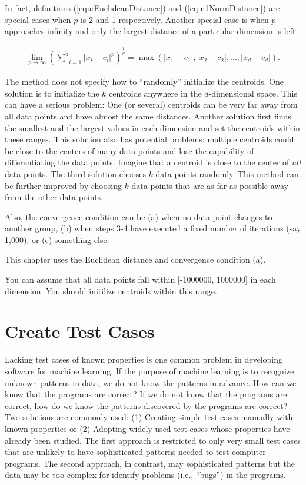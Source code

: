 In fact, definitions (\ref{equ:EuclideanDistance}) and
(\ref{equ:1NormDistance}) are special cases when $p$ is 2 and 1
respectively.  Another special case is when $p$ approaches
infinity and only  the largest distance of a particular
dimension is left:

\begin{gather}
  \underset{p \rightarrow \infty}{\lim}(\underset{i=1}{\overset{d}{\sum}} |x_i - c_i| ^ p) ^ {\frac{1}{p}}
  = \max(|x_1 - c_1|, |x_2 - c_2|, ..., |x_d - c_d|).
\end{gather}

The method does not specify how to ``randomly'' initialize the
centroids. One solution is to initialize the $k$ centroids anywhere in
the $d$-dimensional space.  This can have a serious problem: One (or
several) centroids can be very far away from all data points and have
almost the same distances.  Another solution first finds the smallest
and the largest values in each dimension and set the centroids within
these ranges.  This solution also has potential problems: multiple
centroids could be close to the centers of many data points and lose
the capability of differentiating the data points.  Imagine that a
centroid is close to the center of {\it all} data points.  The third
solution chooses $k$ data points randomly.  This method can be further
improved by choosing $k$ data points that are as far as possible away
from the other data points.






Also, the convergence condition can be (a) when no data
point changes to another group, (b) when steps 3-4 have executed a
fixed number of iterations (say 1,000), or (c) something else.

This chapter uses the Euclidean distance and convergence condition
(a).

You can assume that all data points fall within [-1000000, 1000000] in
   each dimension. You should initilize centroids within this range.

   
\section{Create Test Cases}

Lacking test cases of known properties is one common problem in
developing software for machine learning.  If the purpose of machine
learning is to recognize unknown patterns in data, we do not know the
patterns in advance.  How can we know that the programs are correct?
If we do not know that the programs are correct, how do we know the
patterns discovered by the programs are correct?  Two solutions are
commonly used: (1) Creating simple test cases manually with known
properties or (2) Adopting widely used test cases whose properties
have already been studied. The first approach is restricted to only
very small test cases that are unlikely to have sophisticated patterns
needed to test computer programs.  The second approach, in contrast,
may sophisticated patterns but the data may be too complex for
identify problems (i.e., ``bugs'') in the programs.

